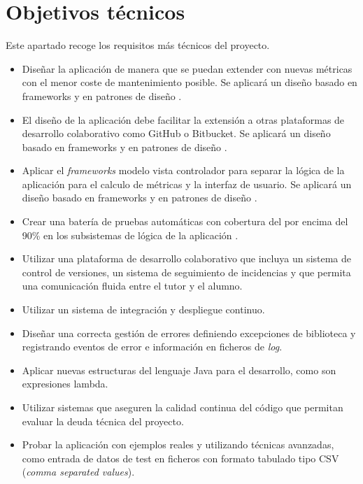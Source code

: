 \section{Objetivos técnicos}
Este apartado recoge los requisitos más técnicos del proyecto.
\begin{itemize}
	\tightlist
	\item Diseñar la aplicación de manera que se puedan extender con nuevas métricas con el menor coste de mantenimiento posible. Se aplicará un diseño basado en frameworks y en patrones de diseño \citep{gamma_patrones_2002}.
	\item El diseño de la aplicación debe facilitar la extensión a otras plataformas de desarrollo colaborativo como GitHub o Bitbucket. Se aplicará un diseño basado en frameworks y en patrones de diseño \citep{gamma_patrones_2002}.
	\item Aplicar el \textit{frameworks} modelo vista controlador para separar la lógica de la aplicación para el calculo de métricas y la interfaz de usuario.
	Se aplicará un diseño basado en frameworks y en patrones de diseño \citep{gamma_patrones_2002}.
	\item Crear una batería de pruebas automáticas con cobertura del por encima del 90\% en los subsistemas de lógica de la aplicación .
	\item Utilizar una plataforma de desarrollo colaborativo que incluya un sistema de control de versiones, un sistema de seguimiento de incidencias y que permita una comunicación fluida entre el tutor y el alumno.
	\item Utilizar un sistema de integración y despliegue continuo.
	\item Diseñar una correcta gestión de errores definiendo excepciones de biblioteca y registrando eventos de error e información en ficheros de \textit{log}. 
	\item Aplicar nuevas estructuras  del lenguaje Java para el desarrollo, como son expresiones lambda. 
	\item Utilizar sistemas que aseguren la calidad continua del código que permitan evaluar la deuda técnica del proyecto.
	\item Probar la aplicación con ejemplos reales y utilizando técnicas avanzadas, como entrada de datos de test en ficheros con formato tabulado tipo CSV (\textit{comma separated values}). 	
\end{itemize}
